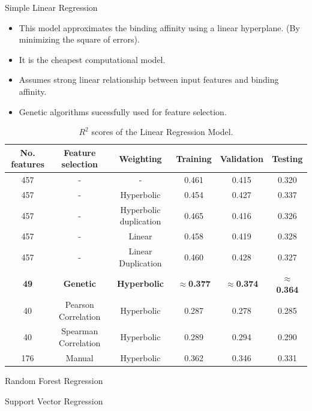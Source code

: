 \documentclass{beamer}
\begin{document}
\begin{frame}[t]{Simple Linear Regression}
\begin{itemize}
\item This model approximates the binding affinity using a linear hyperplane.  (By minimizing the square of errors).
\item It is the cheapest computational model.
\item Assumes strong linear relationship between input features and binding affinity.
\item Genetic algorithms sucessfully used for feature selection.
\end{itemize}

\begin{table} [h!]
\centering
\resizebox{0.75\linewidth}{!} {
\begin{tabular}{ | c | c | c | c | c | c | }
\hline
\textbf{No.  features} & \textbf{Feature selection} & \textbf{Weighting} & \textbf{Training} & \textbf{Validation} & \textbf{Testing} \\ [0.5 ex]
\hline \hline
457 & - & - & 0.461 & 0.415 & 0.320\\
457 &  - & Hyperbolic & 0.454 & 0.427 & 0.337\\
457 & - & Hyperbolic duplication & 0.465 & 0.416 & 0.326\\
457 & - & Linear & 0.458 & 0.419 & 0.328\\
457 & - & Linear Duplication & 0.460 & 0.428 & 0.327\\
\textbf{49} & \textbf{Genetic} & \textbf{Hyperbolic} & \textbf{$\approx$0.377} & \textbf{$\approx$0.374}  & \textbf{$\approx$0.364}\\
40 & Pearson Correlation & Hyperbolic & 0.287 & 0.278  & 0.285 \\ 
40 & Spearman Correlation & Hyperbolic & 0.289 & 0.294  & 0.290 \\ 
176 & Manual & Hyperbolic & 0.362  & 0.346  & 0.331\\ [1ex]
\hline
\end{tabular}
}
\caption{$R^2$ scores of the Linear Regression Model.}
\label {table:1}
\end{table}

\end{frame}

\begin{frame}[t]{Random Forest Regression}

\end{frame}

\begin{frame}[t]{Support Vector Regression}

\end{frame}
\end{document}
